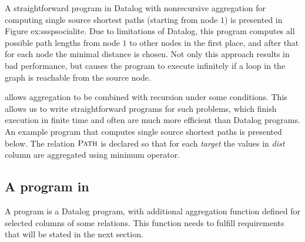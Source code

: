 A straightforward program in Datalog with nonrecursive aggregation for computing single source shortest paths (starting from node $1$) is presented in Figure {ex:ssspsocialite}. Due to limitations of Datalog, this program computes all possible path lengths from node $1$ to other nodes in the first place, and after that for each node the minimal distance is chosen. Not only this approach results in bad performance, but causes the program to execute infinitely if a loop in the graph is reachable from the source node. 


\datalogra allows aggregation to be combined with recursion under some conditions. This allows us to write straightforward programs for such problems, which finish execution in finite time and often are much more efficient than Datalog programs. An example \datalogra program that computes single source shortest paths is presented below. The relation $\textsc{Path}$ is declared so that for each \textit{target} the values in \textit{dist} column are aggregated using minimum operator.




\subsection{A program in \datalogra}
A \datalogra program is a Datalog program, with additional aggregation function defined for selected columns of some relations. This function needs to fulfill requirements that will be stated in the next section.

